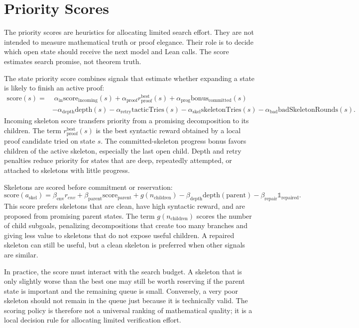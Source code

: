\section{Priority Scores}

The priority scores are heuristics for allocating limited search effort. They are not intended to measure mathematical truth or proof elegance. Their role is to decide which open state should receive the next model and Lean calls. The score estimates search promise, not theorem truth.

The state priority score combines signals that estimate whether expanding a state is likely to finish an active proof:
\[
\begin{aligned}
\mathrm{score}(s) =
&\; \alpha_{\mathrm{in}} \mathrm{score}_{\mathrm{incoming}}(s)
+ \alpha_{\mathrm{proof}} r_{\mathrm{proof}}^{\mathrm{best}}(s)
+ \alpha_{\mathrm{prog}} \mathrm{bonus}_{\mathrm{committed}}(s) \\
&- \alpha_{\mathrm{depth}} \mathrm{depth}(s)
- \alpha_{\mathrm{retry}} \mathrm{tacticTries}(s)
- \alpha_{\mathrm{skel}} \mathrm{skeletonTries}(s)
- \alpha_{\mathrm{bad}} \mathrm{badSkeletonRounds}(s).
\end{aligned}
\]
Incoming skeleton score transfers priority from a promising decomposition to its children. The term \(r_{\mathrm{proof}}^{\mathrm{best}}(s)\) is the best syntactic reward obtained by a local proof candidate tried on state \(s\). The committed-skeleton progress bonus favors children of the active skeleton, especially the last open child. Depth and retry penalties reduce priority for states that are deep, repeatedly attempted, or attached to skeletons with little progress.

Skeletons are scored before commitment or reservation:
\[
\mathrm{score}(a_{\mathrm{skel}}) =
\beta_{\mathrm{env}} r_{env}
+ \beta_{\mathrm{parent}} \mathrm{score}_{\mathrm{parent}}
+ g(n_{\mathrm{children}})
- \beta_{\mathrm{depth}} \mathrm{depth(parent)}
- \beta_{\mathrm{repair}} \mathds{1}_{\mathrm{repaired}}.
\]
This score prefers skeletons that are clean, have high syntactic reward, and are proposed from promising parent states. The term \(g(n_{\mathrm{children}})\) scores the number of child subgoals, penalizing decompositions that create too many branches and giving less value to skeletons that do not expose useful children. A repaired skeleton can still be useful, but a clean skeleton is preferred when other signals are similar.

In practice, the score must interact with the search budget. A skeleton that is only slightly worse than
the best one may still be worth reserving if the parent state is important and the remaining queue is small.
Conversely, a very poor skeleton should not remain in the queue just because it is technically valid. The
scoring policy is therefore not a universal ranking of mathematical quality; it is a local decision rule for
allocating limited verification effort.

